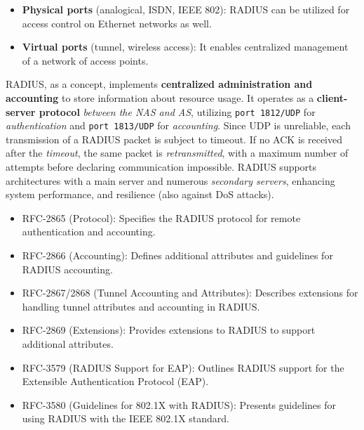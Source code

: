 \begin{itemize}
    \item \textbf{Physical ports} (analogical, ISDN, IEEE 802): RADIUS can be utilized for access control on Ethernet networks as well.
    \item \textbf{Virtual ports} (tunnel, wireless access): It enables centralized management of a network of access points.
\end{itemize}

RADIUS, as a concept, implements \textbf{centralized administration and accounting} to store information about resource usage. It operates as a \textbf{client-server protocol} \textit{between the NAS and AS}, utilizing \texttt{port 1812/UDP} for \textit{authentication} and \texttt{port 1813/UDP} for \textit{accounting}. 
Since UDP is unreliable, each transmission of a RADIUS packet is subject to timeout. If no ACK is received after the \textit{timeout}, the same packet is \textit{retransmitted}, with a maximum number of attempts before declaring communication impossible. 
RADIUS supports architectures with a main server and numerous \textit{secondary servers}, enhancing system performance, and resilience (also against DoS attacks).

\begin{itemize}
    \item RFC-2865 (Protocol): Specifies the RADIUS protocol for remote authentication and accounting.
    \item RFC-2866 (Accounting): Defines additional attributes and guidelines for RADIUS accounting.
    \item RFC-2867/2868 (Tunnel Accounting and Attributes): Describes extensions for handling tunnel attributes and accounting in RADIUS.
    \item RFC-2869 (Extensions): Provides extensions to RADIUS to support additional attributes.
    \item RFC-3579 (RADIUS Support for EAP): Outlines RADIUS support for the Extensible Authentication Protocol (EAP).
    \item RFC-3580 (Guidelines for 802.1X with RADIUS): Presents guidelines for using RADIUS with the IEEE 802.1X standard.
\end{itemize}
